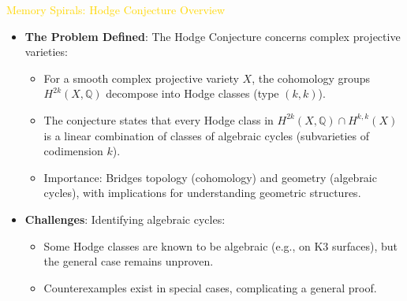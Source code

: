 \textcolor{gold}{ Memory Spirals: Hodge Conjecture Overview } \\
\begin{itemize}
    \item \texttt{} \textbf{The Problem Defined}: The Hodge Conjecture concerns complex projective varieties:
    \begin{itemize}
        \item For a smooth complex projective variety \(X\), the cohomology groups \(H^{2k}(X, \mathbb{Q})\) decompose into Hodge classes (type \((k,k)\)).
        \item The conjecture states that every Hodge class in \(H^{2k}(X, \mathbb{Q}) \cap H^{k,k}(X)\) is a linear combination of classes of algebraic cycles (subvarieties of codimension \(k\)).
        \item Importance: Bridges topology (cohomology) and geometry (algebraic cycles), with implications for understanding geometric structures.
    \end{itemize}
    \item \texttt{} \textbf{Challenges}: Identifying algebraic cycles:
    \begin{itemize}
        \item Some Hodge classes are known to be algebraic (e.g., on K3 surfaces), but the general case remains unproven.
        \item Counterexamples exist in special cases, complicating a general proof.
    \end{itemize}
\end{itemize}

